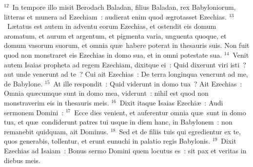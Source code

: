 ${}^{12}$~In tempore illo misit Berodach Baladan, filius Baladan, rex Babyloniorum, litteras et munera ad Ezechiam~: audierat enim quod \ae grotasset Ezechias.
${}^{13}$~L\ae tatus est autem in adventu eorum Ezechias, et ostendit eis domum aromatum, et aurum et argentum, et pigmenta varia, unguenta quoque, et domum vasorum suorum, et omnia qu\ae\ habere poterat in thesauris suis. Non fuit quod non monstraret eis Ezechias in domo sua, et in omni potestate sua.
${}^{14}$~Venit autem Isaias propheta ad regem Ezechiam, dixitque ei~: Quid dixerunt viri isti~? aut unde venerunt ad te~? Cui ait Ezechias~: De terra longinqua venerunt ad me, de Babylone.
${}^{15}$~At ille respondit~: Quid viderunt in domo tua~? Ait Ezechias~: Omnia qu\ae cumque sunt in domo mea, viderunt~: nihil est quod non monstraverim eis in thesauris meis.
${}^{16}$~Dixit itaque Isaias Ezechi\ae~: Audi sermonem Domini~:
${}^{17}$~Ecce dies venient, et auferentur omnia qu\ae\ sunt in domo tua, et qu\ae\ condiderunt patres tui usque in diem hanc, in Babylonem~: non remanebit quidquam, ait Dominus.
${}^{18}$~Sed et de filiis tuis qui egredientur ex te, quos generabis, tollentur, et erunt eunuchi in palatio regis Babylonis.
${}^{19}$~Dixit Ezechias ad Isaiam~: Bonus sermo Domini quem locutus es~: sit pax et veritas in diebus meis.


